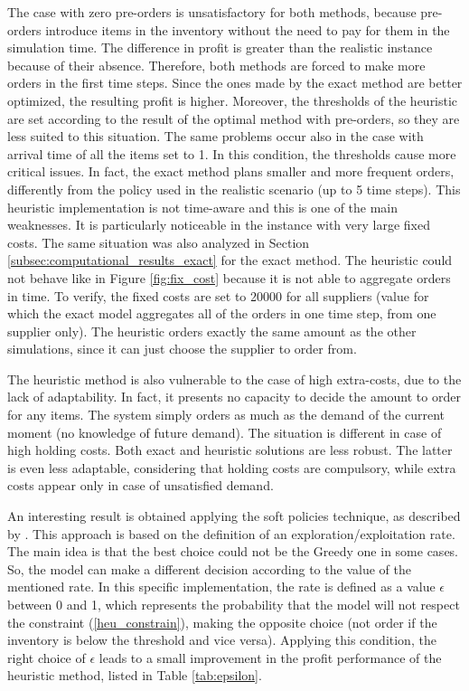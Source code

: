\documentclass{article}
\begin{document}
The case with zero pre-orders is unsatisfactory for both methods, because pre-orders introduce items in the inventory without the need to pay for them in the simulation time. The difference in profit is greater than the realistic instance because of their absence. Therefore, both methods are forced to make more orders in the first time steps. 
\newline
\noindent
Since the ones made by the exact method are better optimized, the resulting profit is higher. Moreover, the thresholds of the heuristic are set according to the result of the optimal method with pre-orders, so they are less suited to this situation. The same problems occur also in the case with arrival time of all the items set to 1. In this condition, the thresholds cause more critical issues. In fact, the exact method plans smaller and more frequent orders, differently from the policy used in the realistic scenario (up to 5 time steps). 
This heuristic implementation is not time-aware and this is one of the main weaknesses. It is particularly noticeable in the instance with very large fixed costs. The same situation was also analyzed in Section \ref{subsec:computational_results_exact} for the exact method. The heuristic could not behave like in Figure \ref{fig:fix_cost} because it is not able to aggregate orders in time. 
\newpage \noindent
To verify, the fixed costs are set to 20000 for all suppliers (value for which the exact model aggregates all of the orders in one time step, from one supplier only).
The heuristic orders exactly the same amount as the other simulations, since it can just choose the supplier to order from. \par

The heuristic method is also vulnerable to the case of high extra-costs, due to the lack of adaptability. In fact, it presents no capacity to decide the amount to order for any items. The system simply orders as much as the demand of the current moment (no knowledge of future demand). 
The situation is different in case of high holding costs. Both exact and heuristic solutions are less robust. The latter is even less adaptable, considering that holding costs are compulsory, while extra costs appear only in case of unsatisfied demand. \par

An interesting result is obtained applying the soft policies technique, as described by \cite{Cimen2013}. This approach is based on the definition of an exploration/exploitation rate. The main idea is that the best choice could not be the Greedy one in some cases. So, the model can make a different decision according to the value of the mentioned rate. In this specific implementation, the rate is defined as a value $\epsilon$ between 0 and 1, which represents the probability that the model will not respect the constraint (\ref{heu_constrain}), making the opposite choice (not order if the inventory is below the threshold and vice versa). Applying this condition, the right choice of $\epsilon$ leads to a small improvement in the profit performance of the heuristic method, listed in Table \ref{tab:epsilon}.
\end{document}
